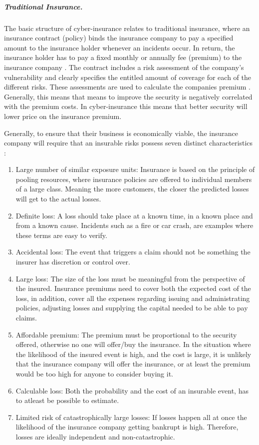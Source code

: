\subparagraph{Traditional Insurance.} The basic structure of cyber-insurance relates to traditional insurance, where an insurance contract (policy) binds the insurance company to pay a specified amount to the insurance holder whenever an incidents occur. In return, the insurance holder has to pay a fixed monthly or annually fee (premium) to the insurance company \cite{robinson2012incentives}. The contract includes a risk assessment of the company's vulnerability and clearly specifies the entitled amount of coverage for each of the different risks. These assessments are used to calculate the companies premium \cite{robinson2012incentives}. Generally, this means that means to improve the security is negatively correlated with the premium costs. In cyber-insurance this means that better security will lower price on the insurance premium.
   
Generally, to ensure that their business is economically viable, the insurance company will require that an insurable risks possess seven distinct characteristics \cite{mehr1980principles}: 
   \begin{enumerate}
   \item Large number of similar exposure units: Insurance is based on the principle of pooling resources, where insurance policies are offered to individual members of a large class. Meaning the more customers, the closer the predicted losses will get to the actual losses.
   \item Definite loss: A loss should take place at a known time, in a known place and from a known
    cause. Incidents such as a fire or car crash, are examples where these terms are easy to verify.
   \item Accidental loss: The event that triggers a claim should not be 
   something the insurer has discretion or control over.
   \item Large loss: The size of the loss must be meaningful from the perspective of the insured.
    Insurance premiums need to cover both the expected cost of the loss, in addition, 
    cover all the expenses regarding issuing and administrating policies, adjusting losses and
     supplying the capital needed to be able to pay claims.
   \item Affordable premium: The premium must be proportional to the security offered, otherwise no
    one will offer/buy the insurance. In the situation where the likelihood of the insured event is
     high, and the cost is large, it is unlikely that the insurance company will offer the insurance,
      or at least the premium would be too high for anyone to consider buying it. 
   \item Calculable loss: Both the probability and the cost of an insurable event,
    has to atleast be possible to estimate. 
   \item Limited risk of catastrophically large losses: If losses happen all at once the likelihood of
    the insurance company getting bankrupt is high. Therefore, losses are ideally independent and non-catastrophic. 
   \end{enumerate}
   
